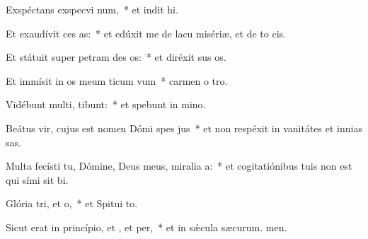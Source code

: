 \item Exspéctans exspecvi num,~* et indit hi.
\item Et exaudívit ces as:~* et edúxit me de lacu misériæ, et de to cis.
\item Et státuit super petram des os:~* et diréxit sus os.
\item Et immísit in os meum ticum vum~* carmen o tro.
\item Vidébunt multi,  tibunt:~* et spebunt in mino.
\item Beátus vir, cujus est nomen Dómi spes jus~* et non respéxit in vanitátes et innias sas.
\item Multa fecísti tu, Dómine, Deus meus, miralia a:~* et cogitatiónibus tuis non est qui sími sit bi.
\item Glória tri, et o,~* et Spitui to.
\item Sicut erat in princípio, et , et per,~* et in sǽcula sæcurum. men.
